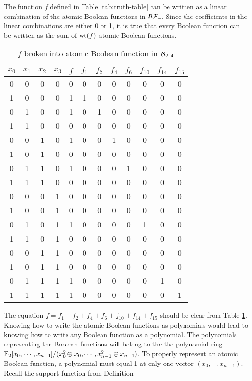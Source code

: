 \par The function $f$ defined in Table \ref{tab:truth-table} can be written
as a linear combination of the atomic Boolean functions in $\mathcal{BF}_4$. Since
the coefficients in the linear combinations are either 0 or 1, it is true
that every Boolean function can be written as the sum of ${\rm wt}(f)$ atomic
Boolean functions.
\begin{table}[h!]
  \centering
  \begin{tabular}{|c|c|c|c||c|c|c|c|c|c|c|c|}
    \hline
    $x_0$&$x_1$&$x_2$&$x_3$
      &$f$&$f_1$&$f_2$&$f_4$&$f_6$&$f_{10}$&$f_{14}$&$f_{15}$\\
    \hline
    0&0&0&0&0&0&0&0&0&0&0&0\\
    1&0&0&0&1&1&0&0&0&0&0&0\\
    0&1&0&0&1&0&1&0&0&0&0&0\\
    1&1&0&0&0&0&0&0&0&0&0&0\\
    0&0&1&0&1&0&0&1&0&0&0&0\\
    1&0&1&0&0&0&0&0&0&0&0&0\\
    0&1&1&0&1&0&0&0&1&0&0&0\\
    1&1&1&0&0&0&0&0&0&0&0&0\\
    0&0&0&1&0&0&0&0&0&0&0&0\\
    1&0&0&1&0&0&0&0&0&0&0&0\\
    0&1&0&1&1&0&0&0&0&1&0&0\\
    1&1&0&1&0&0&0&0&0&0&0&0\\
    0&0&1&1&0&0&0&0&0&0&0&0\\
    1&0&1&1&0&0&0&0&0&0&0&0\\
    0&1&1&1&1&0&0&0&0&0&1&0\\
    1&1&1&1&1&0&0&0&0&0&0&1\\
    \hline
  \end{tabular}
  \caption{$f$ broken into atomic Boolean function in $\mathcal{BF}_4$}
  \label{tab:atomic-f}
\end{table}
\par The equation $f=f_1+f_2+f_4+f_6+f_{10}+f_{14}+f_{15}$ should be clear
from Table \ref{tab:atomic-f}. Knowing how to write the atomic Boolean
functions as polynomials would lead to knowing how to write any Boolean
function as a polynomial. The polynomials representing the Boolean functions
will belong to the the polynomial ring $\mathbb{F}_2[x_0,\cdots,x_{n-1}]/
(x_0^2\oplus x_0,\cdots,x_{n-1}^2\oplus x_{n-1})$. To properly represent
an atomic Boolean function, a polynomial must equal 1 at only one vector
$(x_0,\cdots,x_{n-1})$. Recall the support function from Definition
